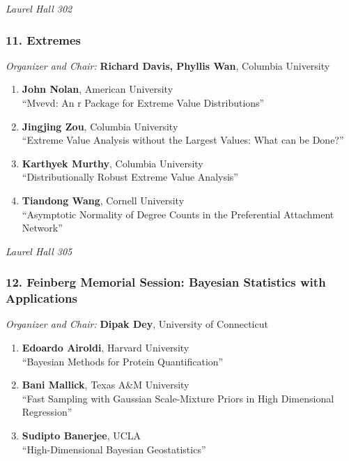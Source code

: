 \emph{Laurel Hall 302} \\[.5em]

\subsubsection*{11. Extremes}

\emph{Organizer and Chair:} \textbf{Richard Davis, Phyllis Wan}, Columbia University

\begin{enumerate}
\item \textbf{John Nolan}, American University \\
``Mvevd: An r Package for Extreme Value Distributions''
\item \textbf{Jingjing Zou}, Columbia University \\
``Extreme Value Analysis without the Largest Values: What can be Done?''
\item \textbf{Karthyek Murthy}, Columbia University \\
``Distributionally Robust Extreme Value Analysis''
\item \textbf{Tiandong Wang}, Cornell University \\
``Asymptotic Normality of Degree Counts in the Preferential Attachment Network''
\end{enumerate}

\emph{Laurel Hall 305} \\[.5em]

\subsubsection*{12. Feinberg Memorial Session: Bayesian Statistics with Applications}

\emph{Organizer and Chair:} \textbf{Dipak Dey}, University of Connecticut

\begin{enumerate}
\item \textbf{Edoardo Airoldi}, Harvard University \\
``Bayesian Methods for Protein Quantification''
\item \textbf{Bani Mallick}, Texas A\&M University \\
``Fast Sampling with Gaussian Scale-Mixture Priors in High Dimensional Regression''
\item \textbf{Sudipto Banerjee}, UCLA \\
``High-Dimensional Bayesian Geostatistics''
\end{enumerate}

